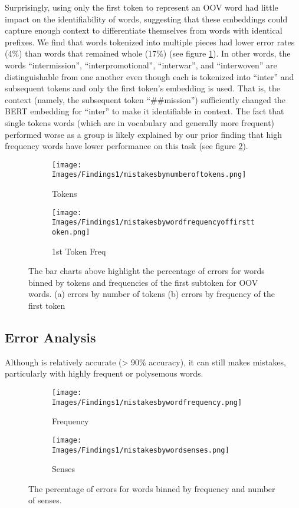 Surprisingly, using only the first token to represent an OOV word had little impact on the identifiability of words, suggesting that these embeddings could capture enough context to differentiate themselves from words with identical prefixes. We find that words tokenized into multiple pieces had lower error rates (4\%) than words that remained whole (17\%) (see figure \ref{fig:tokens}). In other words, the words “intermission”, “interpromotional”, “interwar”, and “interwoven” are distinguishable from one another even though each is tokenized into “inter” and subsequent tokens and only the first token’s embedding is used. That is, the context (namely, the subsequent token “\#\#mission”) sufficiently changed the BERT embedding for “inter” to make it identifiable in context. The fact that single tokens words (which are in vocabulary and generally more frequent) performed worse as a group is likely explained by our prior finding that high frequency words have lower performance on this task (see figure \ref{fig:first_token}).

\begin{figure}
\begin{subfigure}{0.48\columnwidth} 
\texttt{[image: Images/Findings1/mistakesbynumberoftokens.png]} 
\caption{Tokens}
\label{fig:tokens}
\end{subfigure}  
\hfill 
\begin{subfigure}{0.48\columnwidth} 
\texttt{[image: Images/Findings1/mistakesbywordfrequencyoffirsttoken.png]} 
\caption{1st Token Freq}
\label{fig:first_token}
\end{subfigure}
\caption{The bar charts above highlight the percentage of errors for words binned by tokens and frequencies of the first subtoken for OOV words. (a) errors by number of tokens (b) errors by frequency of the first token} 
\label{fig:OOV_figure}
\end{figure}


\subsection{Error Analysis}
Although \wc is relatively accurate (> 90\% accuracy), it can still makes mistakes, particularly with highly frequent or polysemous words.

\begin{figure}
  \begin{subfigure}{0.48\columnwidth}
  \texttt{[image: Images/Findings1/mistakesbywordfrequency.png]}
  \caption{Frequency}
  \label{fig:frequency}
  \end{subfigure}
  \begin{subfigure}{0.48\columnwidth}
  \texttt{[image: Images/Findings1/mistakesbywordsenses.png]}
  \caption{Senses} 
  \label{fig:senses}
  \end{subfigure} 
  \caption{The percentage of errors for words binned by frequency and number of senses.}
  \label{fig: radius vs word frequency}
\end{figure}

